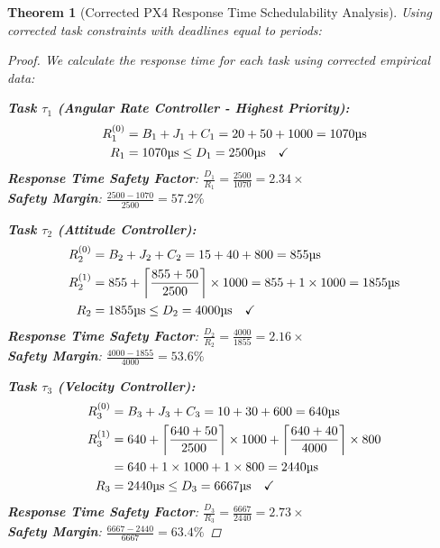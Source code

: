 \documentclass[11pt,a4paper]{article}
\newtheorem{theorem}{Theorem}[section]
\theoremstyle{definition}
\theoremstyle{remark}
\begin{document}
\begin{theorem}[Corrected PX4 Response Time Schedulability Analysis]
Using corrected task constraints with deadlines equal to periods:

\begin{proof}
We calculate the response time for each task using corrected empirical data:

\textbf{Task $\tau_1$ (Angular Rate Controller - Highest Priority):}
\begin{align}
R_1^{(0)} &= B_1 + J_1 + C_1 = 20 + 50 + 1000 = 1070\text{\textmu s} \\
R_1 &= 1070\text{\textmu s} \leq D_1 = 2500\text{\textmu s} \quad \checkmark
\end{align}
\textbf{Response Time Safety Factor}: $\frac{D_1}{R_1} = \frac{2500}{1070} = 2.34\times$ \\
\textbf{Safety Margin}: $\frac{2500 - 1070}{2500} = 57.2\%$

\textbf{Task $\tau_2$ (Attitude Controller):}
\begin{align}
R_2^{(0)} &= B_2 + J_2 + C_2 = 15 + 40 + 800 = 855\text{\textmu s} \\
R_2^{(1)} &= 855 + \left\lceil \frac{855 + 50}{2500} \right\rceil \times 1000 = 855 + 1 \times 1000 = 1855\text{\textmu s} \\
R_2 &= 1855\text{\textmu s} \leq D_2 = 4000\text{\textmu s} \quad \checkmark
\end{align}
\textbf{Response Time Safety Factor}: $\frac{D_2}{R_2} = \frac{4000}{1855} = 2.16\times$ \\
\textbf{Safety Margin}: $\frac{4000 - 1855}{4000} = 53.6\%$

\textbf{Task $\tau_3$ (Velocity Controller):}
\begin{align}
R_3^{(0)} &= B_3 + J_3 + C_3 = 10 + 30 + 600 = 640\text{\textmu s} \\
R_3^{(1)} &= 640 + \left\lceil \frac{640 + 50}{2500} \right\rceil \times 1000 + \left\lceil \frac{640 + 40}{4000} \right\rceil \times 800 \\
&= 640 + 1 \times 1000 + 1 \times 800 = 2440\text{\textmu s} \\
R_3 &= 2440\text{\textmu s} \leq D_3 = 6667\text{\textmu s} \quad \checkmark
\end{align}
\textbf{Response Time Safety Factor}: $\frac{D_3}{R_3} = \frac{6667}{2440} = 2.73\times$ \\
\textbf{Safety Margin}: $\frac{6667 - 2440}{6667} = 63.4\%$


\end{proof}
\end{theorem}
\end{document}

